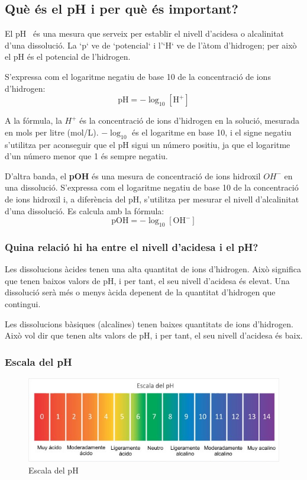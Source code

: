 \subsection{Què és el pH i per què és important?}
El pH~\cite{PH} és una mesura que serveix per establir el nivell d’acidesa o alcalinitat d'una dissolució. La `p` ve de `potencial` i l'`H` ve de l’àtom d’hidrogen; per això el pH és el potencial de l’hidrogen.
%

S'expressa com el logaritme negatiu de base 10 de la concentració de ions d'hidrogen:
$$ \text{pH} = -\log_{10} [\mathrm{H}^+] $$

A la fórmula, la ${H}^+$ és la concentració de ions d'hidrogen en la solució, mesurada en mols per litre (mol/L). $-\log_{10}$ és el logaritme en base 10, i el signe negatiu s'utilitza per aconseguir que el pH sigui un número positiu, ja que el logaritme d'un número menor que 1 és sempre negatiu.

D'altra banda, el \textbf{pOH} és una mesura de concentració de ions hidroxil ${OH}^-$ en una dissolució. S'expressa com el logaritme negatiu de base 10 de la concentració de ions hidroxil i, a diferència del pH, s'utilitza per mesurar el nivell d’alcalinitat d'una dissolució. Es calcula amb la fórmula:
$$ \text{pOH} = -\log_{10} [\mathrm{OH}^-] $$

\subsubsection{Quina relació hi ha entre el nivell d'acidesa i el pH?}
Les dissolucions àcides tenen una alta quantitat de ions d'hidrogen. Això significa que tenen baixos valors de pH, i per tant, el seu nivell d'acidesa és elevat. Una dissolució serà més o menys àcida depenent de la quantitat d'hidrogen que contingui.%


Les dissolucions bàsiques (alcalines) tenen baixes quantitats de ions d'hidrogen. Això vol dir que tenen alts valors de pH, i per tant, el seu nivell d'acidesa és baix.

\subsubsection{Escala del pH}
\begin{figure}[h!]
\centering
\includegraphics[width=1\textwidth]{./Figures/EscaladepH.png}
\caption{Escala del pH}
\label{fig:escaladeph}
\end{figure}

